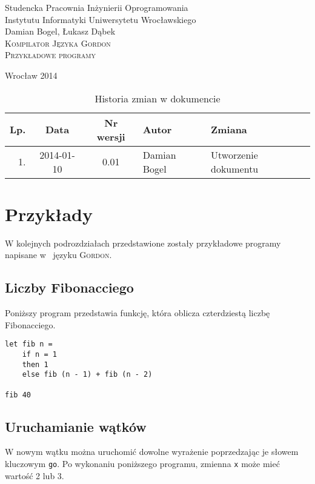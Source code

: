 \documentclass{documentation}
\begin{document}
\begin{titlepage}
\begin{center}
Studencka Pracownia Inżynierii Oprogramowania\\
Instytutu Informatyki Uniwersytetu Wrocławskiego\\[6cm]

Damian Bogel, Łukasz Dąbek\\[1cm]
\textsc{\LARGE Kompilator Języka Gordon}\\[0.5cm]
\textsc{\large Przykładowe programy}

\vfill
Wrocław 2014 \\[2.5cm]

\end{center}
\end{titlepage}

\newpage
\begin{table}
	\centering
    \captionsetup{name=Tabela,labelsep=period}
	\caption{Historia zmian w dokumencie}
		\begin{tabular}{|r|c|c|l|l|}
		\hline
		Lp.  & Data       & Nr wersji & Autor                 & Zmiana \\ \hline
		1.   & 2014-01-10 & 0.01 & Damian Bogel & Utworzenie dokumentu \\ \hline
	\end{tabular}
\end{table}
\newpage

\tableofcontents
\setcounter{page}{2}

\newpage

\section{Przykłady}
\noindent W kolejnych podrozdziałach przedstawione zostały przykładowe programy
napisane w~ języku \textsc{Gordon}.

\subsection{Liczby Fibonacciego}
\noindent Poniższy program przedstawia funkcję, która oblicza czterdziestą
liczbę Fibonacciego.

\begin{verbatim}
let fib n = 
    if n = 1
    then 1
    else fib (n - 1) + fib (n - 2)

fib 40
\end{verbatim}

\subsection{Uruchamianie wątków}
\noindent W nowym wątku można uruchomić dowolne wyrażenie poprzedzając je słowem kluczowym
\texttt{go}. Po wykonaniu poniższego programu, zmienna \texttt{x} może mieć wartość 2 lub 3.
\end{document}

